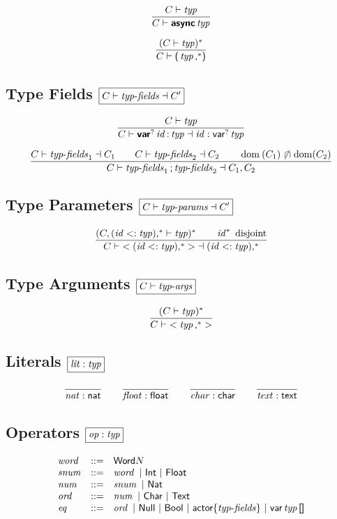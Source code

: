 $$
\frac{
  C \vdash \x{typ}
}{
  C \vdash \KK{async} \x{typ}
}
$$

$$
\frac{
  (C \vdash \x{typ})^\ast
}{
  C \vdash \K( \x{typ}\K,^\ast \K)
}
$$


\subsection*{Type Fields \hfill $\boxed{C \vdash \x{typ-fields} \dashv C'}$}

$$
\frac{
  C \vdash \x{typ}
}{
  C \vdash \KK{var}^? \x{id} \K: \x{typ} \dashv \x{id} : \K{var}^? \x{typ}
}
$$

$$
\frac{
  C \vdash \x{typ-fields}_1 \dashv C_1
  \qquad
  C \vdash \x{typ-fields}_2 \dashv C_2
  \qquad
  \Dom(C_1) \setdisj \Dom(C_2)
}{
  C \vdash \x{typ-fields}_1 \K; \x{typ-fields}_2 \dashv C_1, C_2
}
$$


\subsection*{Type Parameters \hfill $\boxed{C \vdash \x{typ-params} \dashv C'}$}

$$
\frac{
  (C, (\x{id} \Ksub \x{typ})\K,^\ast \vdash \x{typ})^\ast
  \qquad
  \x{id}^\ast ~\text{disjoint}
}{
  C \vdash {\Klt (\x{id} \Ksub \x{typ})\K,^\ast \Kgt} \dashv (\x{id} \Ksub \x{typ})\K,^\ast 
}
$$


\subsection*{Type Arguments \hfill $\boxed{C \vdash \x{typ-args}}$}

$$
\frac{
  (C \vdash \x{typ})^\ast
}{
  C \vdash {\Klt \x{typ}\K,^\ast \Kgt}
}
$$


\subsection*{Literals \hfill $\boxed{\x{lit} : \x{typ}}$}

$$
\frac{
}{
  \x{nat} : \K{nat}
}
\qquad
\frac{
}{
  \x{float} : \K{float}
}
\qquad
\frac{
}{
  \x{char} : \K{char}
}
\qquad
\frac{
}{
  \x{text} : \K{text}
}
$$


\subsection*{Operators \hfill $\boxed{\x{op} : \x{typ}}$}

$$
\begin{array}{@{}lcl@{}}
\x{word} &::=& \K{Word}N \\
\x{snum} &::=& \x{word} ~|~ \K{Int} ~|~ \K{Float} \\
\x{num} &::=& \x{snum} ~|~ \K{Nat} \\
\x{ord} &::=& \x{num} ~|~ \K{Char} ~|~ \K{Text} \\
\x{eq} &::=& \x{ord} ~|~ \K{Null} ~|~ \K{Bool} ~|~ \K{actor} \{\x{typ-fields}\} ~|~ \K{var} \x{typ}\K{[]} \\
\end{array}
$$

